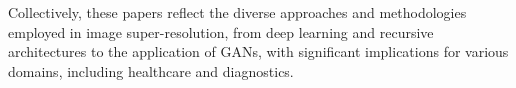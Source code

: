 \documentclass[10pt,twocolumn,letterpaper]{article}
\begin{document}
Collectively, these papers reflect the diverse approaches and methodologies employed in image super-resolution, from deep learning and recursive architectures to the application of GANs, with significant implications for various domains, including healthcare and diagnostics.

{\small


}
\end{document}
